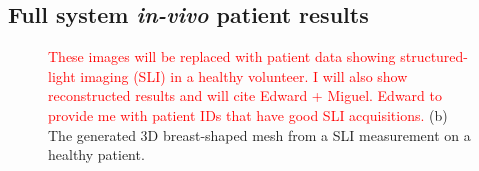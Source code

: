\subsection{Full system \textit{in-vivo} patient results}
\begin{figure}
    \begin{center}
    \end{center}
    \caption{\textcolor{red}{These images will be replaced with patient data showing structured-light imaging (SLI) in a healthy volunteer. I will also show reconstructed results and will cite Edward + Miguel. Edward to provide me with patient IDs that have good SLI acquisitions. } (b) The generated 3D breast-shaped mesh from a SLI measurement on a healthy patient.} 
    \label{fig:PatientResults}
\end{figure} 

